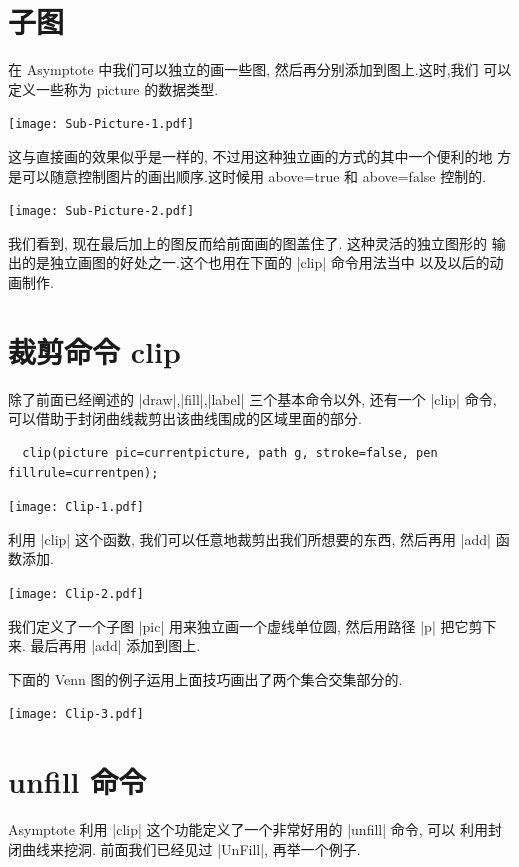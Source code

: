 \documentclass[nofonts,CJKnormalspaces]{ctexbook}[2009/05/20]
\begin{document}
\section{子图}
在 Asymptote 中我们可以独立的画一些图, 然后再分别添加到图上.这时,我们
可以定义一些称为 {picture} 的数据类型.
\begin{center}\texttt{[image: Sub-Picture-1.pdf]}\end{center}%


这与直接画的效果似乎是一样的, 不过用这种独立画的方式的其中一个便利的地
方是可以随意控制图片的画出顺序.这时候用 {above=true} 和 {above=false}
控制的.
\begin{center}\texttt{[image: Sub-Picture-2.pdf]}\end{center}%


我们看到, 现在最后加上的图反而给前面画的图盖住了. 这种灵活的独立图形的
输出的是独立画图的好处之一.这个也用在下面的 |clip| 命令用法当中
以及以后的动画制作.

\section{裁剪命令 clip}
除了前面已经阐述的 |draw|,|fill|,|label| 三个基本命令以外, 还有一个
|clip| 命令, 可以借助于封闭曲线裁剪出该曲线围成的区域里面的部分.
\begin{lstlisting}
  clip(picture pic=currentpicture, path g, stroke=false, pen fillrule=currentpen);
\end{lstlisting}

\begin{center}\texttt{[image: Clip-1.pdf]}\end{center}%


利用 |clip| 这个函数, 我们可以任意地裁剪出我们所想要的东西, 然后再用
|add| 函数添加.
\begin{center}\texttt{[image: Clip-2.pdf]}\end{center}%


我们定义了一个子图 |pic| 用来独立画一个虚线单位圆, 然后用路径
|p| 把它剪下来. 最后再用 |add| 添加到图上.

下面的 Venn 图的例子运用上面技巧画出了两个集合交集部分的.
\begin{center}\texttt{[image: Clip-3.pdf]}\end{center}%


\section{unfill 命令}
Asymptote 利用 |clip| 这个功能定义了一个非常好用的 |unfill| 命令, 可以
利用封闭曲线来挖洞. 前面我们已经见过 |UnFill|, 再举一个例子.
\end{document}

